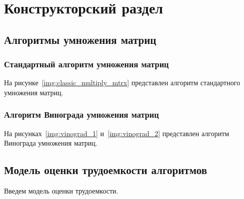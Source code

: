 \chapter{Конструкторский раздел}
\section{Алгоритмы умножения матриц}
\label{section:shemas_algo}

\subsection{Стандартный алгоритм умножения матриц}
На рисунке~\ref{img:classic_multiply_mtrx} представлен алгоритм стандартного умножения матриц. 

\newpage
\subsection{Алгоритм Винограда умножения матриц}
На рисунках~\ref{img:vinograd_1} и~\ref{img:vinograd_2} представлен алгоритм Винограда умножения матриц. 


\newpage
\section{Модель оценки трудоемкости алгоритмов}
Введем модель оценки трудоемкости.

